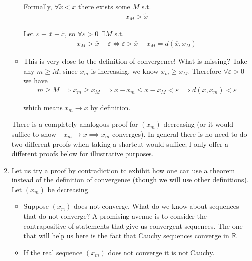 \documentclass{article}
\begin{document}
\begin{enumerate}
\begin{itemize}[label=$\circ$]
        Formally, $\forall \widetilde{x} < \overline{x}$ there exists some $M$ s.t.
        \begin{align*}
          x_M > \widetilde{x}
        \end{align*}

        Let $\varepsilon \equiv \overline{x} - \widetilde{x}$, so $\forall \varepsilon > 0 ~~ \exists M$ s.t.
        \begin{align*}
          x_M > \overline{x} - \varepsilon
          \iff
          \varepsilon > \overline{x} - x_M = d(\overline{x}, x_M)
        \end{align*}

      \item This is very close to the definition of convergence! What is missing? Take any $m \ge M$; since $x_m$ is increasing, we know $x_m \ge x_M$. Therefore $\forall \varepsilon > 0$ we have
        \begin{align*}
          m \ge M
          \implies
          x_m \ge x_M
          \implies
          \overline{x} - x_m \le \overline{x} - x_M < \varepsilon
          \implies
          d(\overline{x}, x_m) < \varepsilon
        \end{align*}

        which means $x_m \to \overline{x}$ by definition.
      \end{itemize}

      There is a completely analogous proof for $(x_m)$ decreasing (or it would suffice to show $-x_m \to x \implies x_m$ converges). In general there is no need to do two different proofs when taking a shortcut would suffice; I only offer a different proofs below for illustrative purposes.

    \item Let us try a proof by contradiction to exhibit how one can use a theorem instead of the definition of convergence (though we will use other definitions). Let $(x_m)$ be decreasing.
    \begin{itemize}[label=$\circ$]
      \item Suppose $(x_m)$ does not converge. What do we know about sequences that do not converge?  A promising avenue is to consider the contrapositive of statements that give us convergent sequences. The one that will help us here is the fact that Cauchy sequences converge in $\mathbb{R}$.

      \item If the real sequence $(x_m)$ does not converge it is not Cauchy.


\end{itemize}
\end{enumerate}
\end{document}
